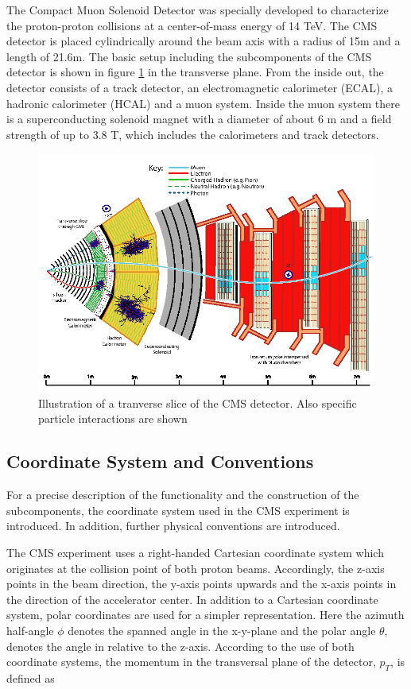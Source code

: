 \documentclass[12pt, a4paper]{thesis}
\begin{document}
The Compact Muon Solenoid Detector was specially developed to
characterize the proton-proton collisions at a center-of-mass energy
of 14 TeV. The CMS detector is placed cylindrically around the beam
axis with a radius of 15m and a length of 21.6m. The basic setup
including the subcomponents of the CMS detector is shown in figure
\ref{cms-detector} in the transverse plane.  From the inside out, the
detector consists of a track detector, an electromagnetic calorimeter
(ECAL), a hadronic calorimeter (HCAL) and a muon system.  Inside the
muon system there is a superconducting solenoid magnet with a diameter
of about 6 m and a field strength of up to 3.8 T, which includes the
calorimeters and track detectors.

\begin{figure}[hbtp]
  \centering
  \includegraphics[width=0.8 \textwidth]{../images/cms_detector.png}
  \caption{Illustration of a tranverse slice of the CMS detector. Also
    specific particle interactions are shown \cite{sirunyan17}}
  \label{cms-detector}
\end{figure}

\subsection{Coordinate System and Conventions} %
\label{sec:org067f254}

For a precise description of the functionality and the construction of
the subcomponents, the coordinate system used in the CMS experiment is
introduced. In addition, further physical conventions are introduced.

The CMS experiment uses a right-handed Cartesian coordinate system
which originates at the collision point of both proton
beams. Accordingly, the z-axis points in the beam direction, the
y-axis points upwards and the x-axis points in the direction of the
accelerator center. In addition to a Cartesian coordinate system,
polar coordinates are used for a simpler representation. Here the
azimuth half-angle \(\phi\) denotes the spanned angle in the x-y-plane
and the polar angle \(\theta\), denotes the angle in relative to the
z-axis.  According to the use of both coordinate systems, the momentum
in the transversal plane of the detector, \(p_T\), is defined as
\end{document}

